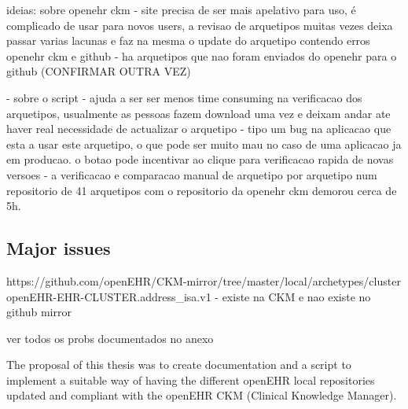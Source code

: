 \documentclass[mim_thesis.tex]{subfiles}
\begin{document}
ideias: 
sobre openehr ckm - site precisa de ser mais apelativo para uso, é complicado de usar para novos users, a revisao de arquetipos muitas vezes deixa passar varias lacunas e faz na mesma o update do arquetipo contendo erros
openehr ckm e github - ha arquetipos que nao foram enviados do openehr para o github (CONFIRMAR OUTRA VEZ) 


- sobre o script - ajuda a ser ser menos time consuming na verificacao dos arquetipos, usualmente as pessoas fazem download uma vez e deixam andar ate haver real necessidade de actualizar o arquetipo - tipo um bug na aplicacao que esta a usar este arquetipo, o que pode ser muito mau no caso de uma aplicacao ja em producao. o botao pode incentivar ao clique para verificacao rapida de novas versoes - a verificacao e comparacao manual de arquetipo por arquetipo num repositorio de 41 arquetipos com o repositorio da openehr ckm demorou cerca de 5h. 



\subsection{Major issues}

https://github.com/openEHR/CKM-mirror/tree/master/local/archetypes/cluster
openEHR-EHR-CLUSTER.address\_isa.v1 - existe na CKM e nao existe no github mirror 

ver todos os probs documentados no anexo

The proposal of this thesis was to create documentation and a script to implement a suitable way of having the different openEHR local repositories updated and compliant with the openEHR CKM (Clinical Knowledge Manager).   
\end{document}
